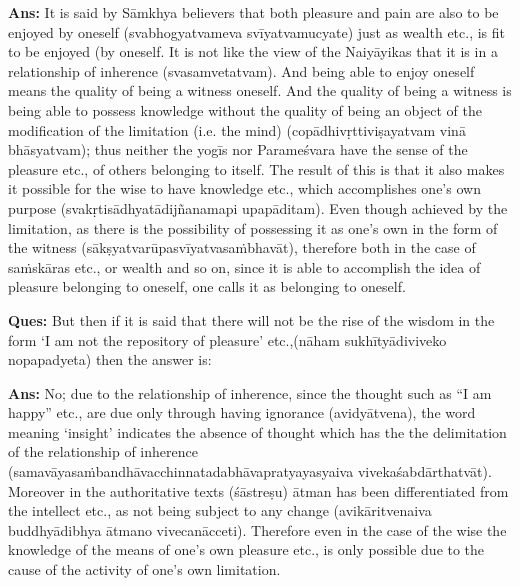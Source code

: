 \textbf{Ans:} It is said by Sāmkhya believers that both pleasure and pain are also to be enjoyed by oneself (svabhogyatvameva svīyatvamucyate) just as wealth etc., is fit to be enjoyed (by oneself. It is not like the view of the Naiyāyikas that it is in a relationship of inherence (svasamvetatvam). And being able to enjoy oneself means the quality of being a witness oneself. And the quality of being a witness is being able to possess knowledge without the quality of being an object of the modification of the limitation (i.e. the mind) (copādhivṛttiviṣayatvam vinā bhāsyatvam); thus neither the yogīs nor Parameśvara have the sense of the pleasure etc., of others belonging to itself. The result of this is that it also makes it possible for the wise to have knowledge etc., which accomplishes one’s own purpose (svakṛtisādhyatādijñanamapi upapāditam). Even though achieved by the limitation, as there is the possibility of possessing it as one’s own in the form of the witness (sākṣyatvarūpasvīyatvasaṁbhavāt), therefore both in the case of saṁskāras etc., or wealth and so on, since it is able to accomplish the idea of pleasure belonging to oneself, one calls it as belonging to oneself.

\textbf{Ques:} But then if it is said that there will not be the rise of the wisdom in the form ‘I am not the repository of pleasure’ etc.,(nāham sukhītyādiviveko nopapadyeta) then the answer is:

\textbf{Ans:}  No; due to the relationship of inherence, since the thought such as “I am happy” etc., are due only through having ignorance (avidyātvena), the word meaning ‘insight’ indicates the absence of thought which has the the delimitation of the relationship of inherence (samavāyasaṁbandhāvacchinnatadabhāvapratyayasyaiva vivekaśabdārthatvāt). Moreover in the authoritative texts (śāstreṣu) ātman has been differentiated from the intellect etc., as not being subject to any change (avikāritvenaiva buddhyādibhya ātmano vivecanācceti). Therefore even in the case of the wise the knowledge of the means of one’s own pleasure etc., is only possible due to the cause of the activity of one’s own limitation. 


